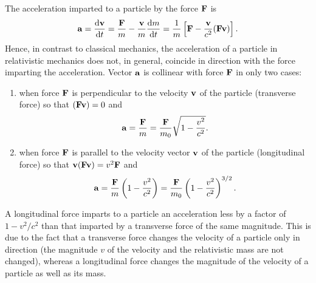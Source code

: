 \subsection{}\label{5.6.5} The acceleration imparted to a particle by the force $\vb{F}$ is
\begin{equation*}%
\vb{a} = \dv{\vb{v}}{t} =\frac{\vb{F}}{m} - \frac{\vb{v}}{m} \dv{m}{t}
= \frac{1}{m} \left[ \vb{F} - \frac{\vb{v}}{c^{2}} (\vb{Fv}) \right].
\end{equation*}
Hence, in contrast to classical mechanics, the acceleration of a particle in relativistic mechanics does not, in general, coincide in direction with the force imparting the acceleration. Vector $\vb{a}$ is collinear with force $\vb{F}$ in only two cases:
\begin{enumerate}[label=(\alph*)]
\item when force $\vb{F}$ is perpendicular to the velocity $\vb{v}$ of the particle (transverse force) so that $(\vb{Fv}) = 0$ and
\begin{equation*}%
\vb{a} = \frac{\vb{F}}{m} = \frac{\vb{F}}{m_{0}}\sqrt{1 - \dfrac{v^{2}}{c^{2}}}.
\end{equation*}
\item when force $\vb{F}$ is parallel to the velocity vector $\vb{v}$ of the particle (longitudinal force) so that $\vb{v} (\vb{Fv}) = v^{2}\vb{F}$ and
\begin{equation*}%
\vb{a} = \frac{\vb{F}}{m}\left( 1 - \dfrac{v^{2}}{c^{2}}\right) = \frac{\vb{F}}{m_{0}} \left( 1 - \dfrac{v^{2}}{c^{2}} \right)^{3/2}.
\end{equation*}
\end{enumerate}
A longitudinal force imparts to a particle an acceleration less by a factor of $1 - v^{2}/c^{2}$ than that imparted by a transverse force of the same magnitude. This is due to the fact that a transverse force changes the velocity of a particle only in direction (the magnitude $v$ of the velocity and the relativistic mass are not changed), whereas a longitudinal force changes the magnitude of the velocity of a particle as well as its mass.

